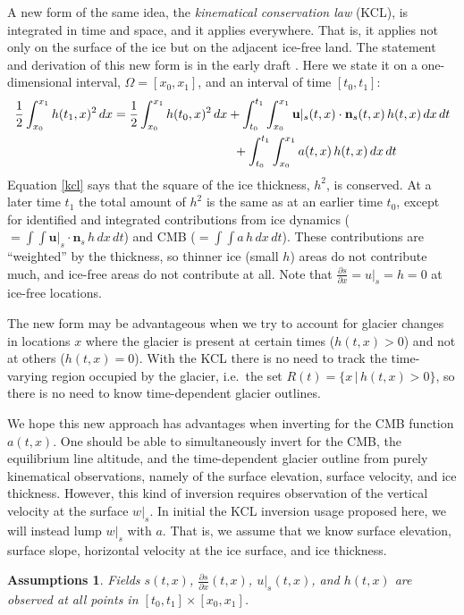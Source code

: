 \documentclass[letterpaper,final,12pt,reqno]{amsart}
\newtheorem*{assumptions}{Assumptions}
\newcommand{\bn}{\mathbf{n}}
\newcommand{\bu}{\mathbf{u}}
\begin{document}
A new form of the same idea, the \emph{kinematical conservation law} (KCL), is integrated in time and space, and it applies everywhere.  That is, it applies not only on the surface of the ice but on the adjacent ice-free land.  The statement and derivation of this new form is in the early draft \cite{Bueler2022}.  Here we state it on a one-dimensional interval, $\Omega=[x_0,x_1]$, and an interval of time $[t_0,t_1]$:
\begin{align}
\frac{1}{2} \int_{x_0}^{x_1} h(t_1,x)^2\,dx &= \frac{1}{2} \int_{x_0}^{x_1} h(t_0,x)^2\,dx + \int_{t_0}^{t_1} \int_{x_0}^{x_1} \bu|_s(t,x)\cdot \bn_s(t,x)\,h(t,x) \,dx\,dt \label{kcl} \\
  &\hspace{34mm} + \int_{t_0}^{t_1} \int_{x_0}^{x_1} a(t,x)\,h(t,x) \,dx\,dt \notag
\end{align}
Equation \eqref{kcl} says that the square of the ice thickness, $h^2$, is conserved.  At a later time $t_1$ the total amount of $h^2$ is the same as at an earlier time $t_0$, except for identified and integrated contributions from ice dynamics ($=\int \int \bu|_s \cdot \bn_s\,h \,dx\,dt$) and CMB ($=\int \int a\,h \,dx\,dt$).  These contributions are ``weighted'' by the thickness, so thinner ice (small $h$) areas do not contribute much, and ice-free areas do not contribute at all.  Note that $\frac{\partial s}{\partial x} = u|_s = h = 0$ at ice-free locations.

The new form may be advantageous when we try to account for glacier changes in locations $x$ where the glacier is present at certain times ($h(t,x)>0$) and not at others ($h(t,x)=0$).  With the KCL there is no need to track the time-varying region occupied by the glacier, i.e.~the set $R(t) = \{x\,|\,h(t,x)>0\}$, so there is no need to know time-dependent glacier outlines.

We hope this new approach has advantages when inverting for the CMB function $a(t,x)$.  One should be able to simultaneously invert for the CMB, the equilibrium line altitude, and the time-dependent glacier outline from purely kinematical observations, namely of the surface elevation, surface velocity, and ice thickness.  However, this kind of inversion requires observation of the vertical velocity at the surface $w|_s$.  In initial the KCL inversion usage proposed here, we will instead lump $w|_s$ with $a$.  That is, we assume that we know surface elevation, surface slope, horizontal velocity at the ice surface, and ice thickness.

\begin{assumptions}  Fields $s(t,x)$, $\frac{\partial s}{\partial x}(t,x)$, $u|_s(t,x)$, and $h(t,x)$ are observed at all points in $[t_0,t_1] \times [x_0,x_1]$. \end{assumptions}
\end{document}
